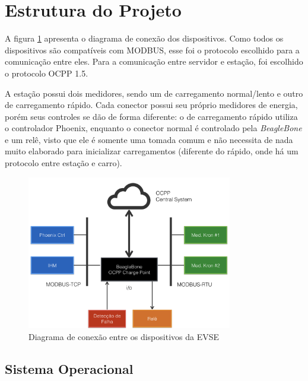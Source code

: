   \section{Estrutura do Projeto}

    A figura \ref{fig:proj-diagram} apresenta o diagrama de conexão dos dispositivos. Como todos os dispositivos são compatíveis com MODBUS, esse foi o protocolo escolhido para a comunicação entre eles. Para a comunicação entre servidor e estação, foi escolhido o protocolo \ac{OCPP} 1.5.

    A estação possui dois medidores, sendo um de carregamento normal/lento e outro de carregamento rápido. Cada conector possui seu próprio medidores de energia, porém seus controles se dão de forma diferente: o de carregamento rápido utiliza o controlador Phoenix, enquanto o conector normal é controlado pela \textit{BeagleBone} e um relê, visto que ele é somente uma tomada comum e não necessita de nada muito elaborado para inicializar carregamentos (diferente do rápido, onde há um protocolo entre estação e carro).

    \begin{figure}[H]
      \begin{center}
        \includegraphics[width=0.8\textwidth,natwidth=400,natheight=288]{assets/images/devices-diagram.png}
        \caption{Diagrama de conexão entre os dispositivos da \ac{EVSE}}
        \label{fig:proj-diagram}
      \end{center}
    \end{figure}

    \subsection{Sistema Operacional}

